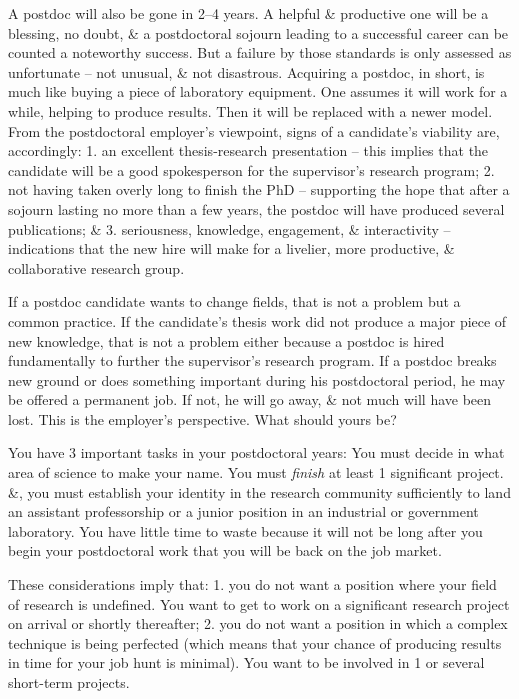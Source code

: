 \documentclass{article}
\begin{document}
\begin{enumerate}
\begin{itemize}
\begin{itemize}
			A postdoc will also be gone in 2--4 years. A helpful \& productive one will be a blessing, no doubt, \& a postdoctoral sojourn leading to a successful career can be counted a noteworthy success. But a failure by those standards is only assessed as unfortunate -- not unusual, \& not disastrous. Acquiring a postdoc, in short, is much like buying a piece of laboratory equipment. One assumes it will work for a while, helping to produce results. Then it will be replaced with a newer model. From the postdoctoral employer's viewpoint, signs of a candidate's viability are, accordingly: 1. an excellent thesis-research presentation -- this implies that the candidate will be a good spokesperson for the supervisor's research program; 2. not having taken overly long to finish the PhD -- supporting the hope that after a sojourn lasting no more than a few years, the postdoc will have produced several publications; \& 3. seriousness, knowledge, engagement, \& interactivity -- indications that the new hire will make for a livelier, more productive, \& collaborative research group.

			If a postdoc candidate wants to change fields, that is not a problem but a common practice. If the candidate's thesis work did not produce a major piece of new knowledge, that is not a problem either because a postdoc is hired fundamentally to further the supervisor's research program. If a postdoc breaks new ground or does something important during his postdoctoral period, he may be offered a permanent job. If not, he will go away, \& not much will have been lost. This is the employer's perspective. What should yours be?

			You have 3 important tasks in your postdoctoral years: You must decide in what area of science to make your name. You must \textit{finish} at least 1 significant project. \&, you must establish your identity in the research community sufficiently to land an assistant professorship or a junior position in an industrial or government laboratory. You have little time to waste because it will not be long after you begin your postdoctoral work that you will be back on the job market.

			These considerations imply that: 1. you do not want a position where your field of research is undefined. You want to get to work on a significant research project on arrival or shortly thereafter; 2. you do not want a position in which a complex technique is being perfected (which means that your chance of producing results in time for your job hunt is minimal). You want to be involved in 1 or several short-term projects.


\end{itemize}
\end{itemize}
\end{enumerate}
\end{document}
